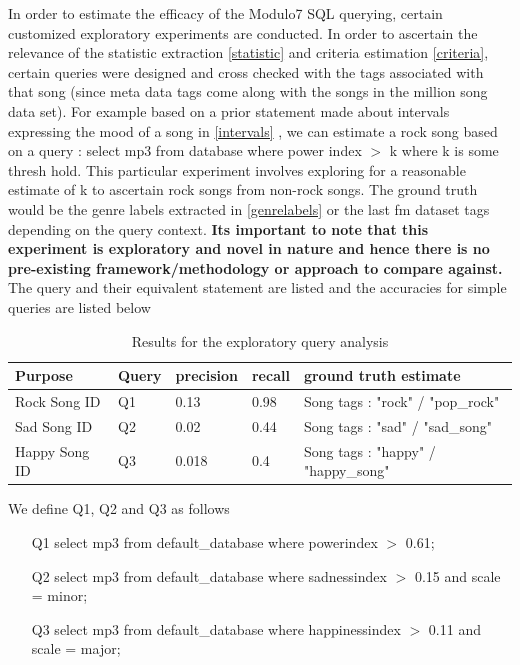 \noindent In order to estimate the efficacy of the Modulo7 SQL querying, certain customized exploratory experiments are conducted. In order to ascertain the relevance of the statistic extraction \ref{statistic} and criteria estimation \ref{criteria}, certain queries were designed and cross checked with the tags associated with that song (since meta data tags come along with the songs in the million song data set). For example based on a prior statement made about intervals expressing the mood of a song in \ref{intervals} , we can estimate a rock song based on a query : select mp3 from database where power index $>$ k where k is some thresh hold. This particular experiment involves exploring for a reasonable estimate of k to ascertain rock songs from non-rock songs. The ground truth would be the genre labels extracted in \ref{genrelabels} or the last fm dataset tags \cite{msd} depending on the query context. \textbf{Its important to note that this experiment is exploratory and novel in nature and hence there is no pre-existing framework/methodology or approach to compare against.}\\

\noindent The query and their equivalent statement are listed and the accuracies for simple queries are listed below \\

\begin{table}[!htb]
\begin{center}
    \begin{tabular}{| l | l | l | l | l |}
    \hline
    Purpose &  Query & precision  & recall & ground truth estimate \\ \hline
    Rock Song ID &  Q1 & 0.13  & 0.98 & Song tags : "rock" / "pop\_rock" \\ \hline
    Sad Song ID &  Q2 & 0.02  & 0.44 & Song tags : "sad" / "sad\_song" \\ \hline
    Happy Song ID &  Q3 & 0.018  & 0.4 & Song tags : "happy" / "happy\_song" \\
    \hline
    \end{tabular}
\end{center}
\caption{Results for the exploratory query analysis}
\end{table}

\newpage

\noindent We define Q1, Q2 and Q3 as follows

\begin{enumerate}
\item [Q1] select mp3 from default\_database where powerindex $>$ 0.61;
\item [Q2] select mp3 from default\_database where sadnessindex $>$ 0.15 and scale = minor;
\item [Q3] select mp3 from default\_database where happinessindex $>$ 0.11 and scale = major;
\end{enumerate}


